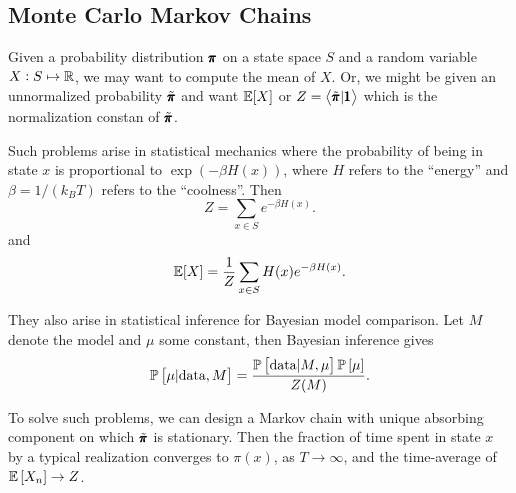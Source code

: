 \subsection{Monte Carlo Markov Chains}

Given a probability distribution $\pmb{\pi}$ on a state space $S$ and a random variable $X: S \mapsto \mathbb{R}$, we may want to compute the mean of $X$. Or, we might be given an unnormalized probability $\tilde{\pmb{\pi}}$ and want $\mathbb{E}[X]$ or $Z = \left< \tilde{\pmb{\pi}} | \pmb{1} \right>$ which is the normalization constan of $\tilde{\pmb{\pi}}$.

Such problems arise in statistical mechanics where the probability of being in state $x$ is proportional to $\exp(-\beta H(x))$, where $H$ refers to the ``energy'' and $\beta = 1/(k_BT)$ refers to the ``coolness''. Then
\begin{equation*}
    Z = \sum_{x \in S} e^{-\beta H(x)}.
\end{equation*}
and 
\begin{equation*}
    \mathbb{E} [X] = \frac{1}{Z} \sum_{x \in S} H(x) e^{- \beta H(x)}.
\end{equation*}

They also arise in statistical inference for Bayesian model comparison. Let $M$ denote the model and $\mu$ some constant, then Bayesian inference gives 
\begin{equation*}
    \mathbb{P} \left[ \mu | \text{data}, M \right] = \frac{\mathbb{P} \left[ \text{data} | M, \mu \right] \mathbb{P} \left[ \mu \right] }{Z(M)}.
\end{equation*}

To solve such problems, we can design a Markov chain with unique absorbing component on which $\tilde{\pmb{\pi}}$ is stationary. Then the fraction of time spent in state $x$ by a typical realization converges to $\pi(x)$, as $T \to \infty$, and the time-average of $\mathbb{E} \left[ X_n \right] \to Z$.

